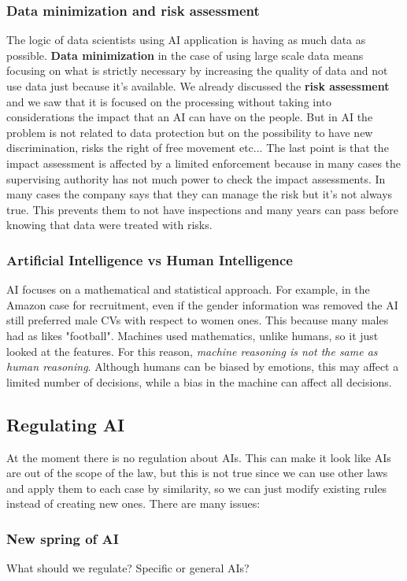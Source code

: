 \subsubsection{Data minimization and risk assessment}
The logic of data scientists using AI application is having as much data as possible. \textbf{Data minimization} in the case of using large scale data means focusing on what is strictly necessary by increasing the quality of data and not use data just because it's available.
We already discussed the \textbf{risk assessment} and we saw that it is focused on the processing without taking into considerations the impact that an AI can have on the people. But in AI the problem is not related to data protection but on the possibility to have new discrimination, risks the right of free movement etc...
The last point is that the impact assessment is affected by a limited enforcement because in many cases the supervising authority has not much power to check the impact assessments.
In many cases the company says that they can manage the risk but it's not always true. This prevents them to not have inspections and many years can pass before knowing that data were treated with risks.

\subsubsection{Artificial Intelligence vs Human Intelligence}
AI focuses on a mathematical and statistical approach. For example, in the Amazon case for recruitment, even if the gender information was removed the AI still preferred male CVs with respect to women ones. This because many males had as likes "football". Machines used mathematics, unlike humans, so it just looked at the features. For this reason, \textit{machine reasoning is not the same as human reasoning}. Although humans can be biased by emotions, this may affect a limited number of decisions, while a bias in the machine can affect all decisions.

\subsection{Regulating AI}
At the moment there is no regulation about AIs. This can make it look like AIs are out of the scope of the law, but this is not true since we can use other laws and apply them to each case by similarity, so we can just modify existing rules instead of creating new ones. There are many issues:
\subsubsection{New spring of AI}
What should we regulate? Specific or general AIs?

